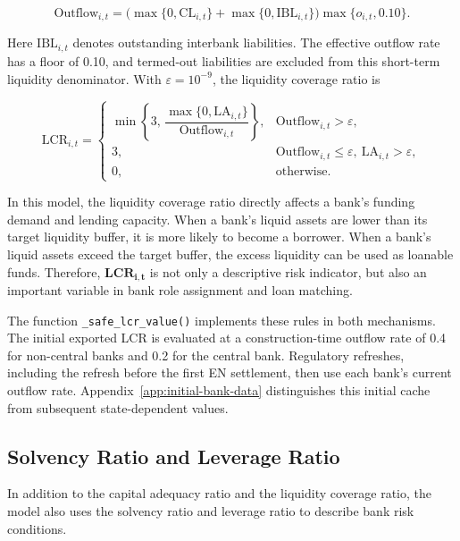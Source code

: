 \begin{equation}
\mathrm{Outflow}_{i,t}
 =\bigl(\max\{0,\mathrm{CL}_{i,t}\}+\max\{0,\mathrm{IBL}_{i,t}\}\bigr)
 \max\{o_{i,t},0.10\}\label{eq:outflow}.
\end{equation}


Here \(\mathrm{IBL}_{i,t}\) denotes outstanding interbank liabilities.
 The effective outflow rate has a floor of 0.10, and termed-out liabilities
 are excluded from this short-term liquidity denominator. With
 \(\varepsilon=10^{-9}\), the liquidity coverage ratio is


\begin{equation}
\mathrm{LCR}_{i,t}=\begin{cases}
 \min\left\{3,\,\dfrac{\max\{0,\mathrm{LA}_{i,t}\}}{\mathrm{Outflow}_{i,t}}\right\},
 &\mathrm{Outflow}_{i,t}>\varepsilon,\\[3pt]
 3,&\mathrm{Outflow}_{i,t}\leq\varepsilon,\ \mathrm{LA}_{i,t}>\varepsilon,\\
 0,&\text{otherwise}.
 \end{cases}\label{eq:lcr}
\end{equation}


In this model, the liquidity coverage ratio directly affects a bank's
funding demand and lending capacity. When a bank's liquid assets are
lower than its target liquidity buffer, it is more likely to become a
borrower. When a bank's liquid assets exceed the target buffer, the
excess liquidity can be used as loanable funds. Therefore,
\(\mathbf{LC}\mathbf{R}_{\mathbf{i},\mathbf{t}}\) is not only a
descriptive risk indicator, but also an important variable in bank role
assignment and loan matching.

The function \texttt{\_safe\_lcr\_value()} implements these rules in both
 mechanisms. The initial exported LCR is evaluated at a construction-time
 outflow rate of 0.4 for non-central banks and 0.2 for the central bank.
 Regulatory refreshes, including the refresh before the first EN settlement,
 then use each bank's current outflow rate. Appendix~\ref{app:initial-bank-data}
 distinguishes this initial cache from subsequent state-dependent values.

\subsection{Solvency Ratio and Leverage Ratio}

In addition to the capital adequacy ratio and the liquidity coverage
ratio, the model also uses the solvency ratio and leverage ratio to
describe bank risk conditions.

